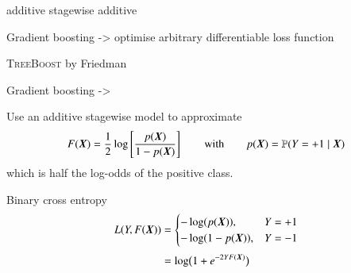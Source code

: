 additive stagewise additive



Gradient boosting -> optimise arbitrary differentiable loss function


\textsc{TreeBoost} by Friedman~\cite{Friedman:2000,Friedman:2001wbq}


Gradient boosting ->




Use an additive stagewise model to approximate
\begin{align*}
  F(\myvec{X}) = \frac{1}{2} \log\left[ \frac{p(\myvec{X})}{1 - p(\myvec{X})} \right] \qquad \text{with} \qquad p(\myvec{X}) = \mathbb{P}(Y = +1 \mid \myvec{X})
\end{align*}
which is half the log-odds of the positive class.


Binary cross entropy
\begin{align*}
  L(Y, F(\myvec{X})) &=
  \begin{cases}
    - \log( p(\myvec{X}) ), & Y = +1 \\
    - \log( 1 - p(\myvec{X}) ), & Y = -1
  \end{cases} \\[0.3em]
                     &= \log\bigl( 1 + e^{-2 Y F(\myvec{X})} \bigr)
\end{align*}



